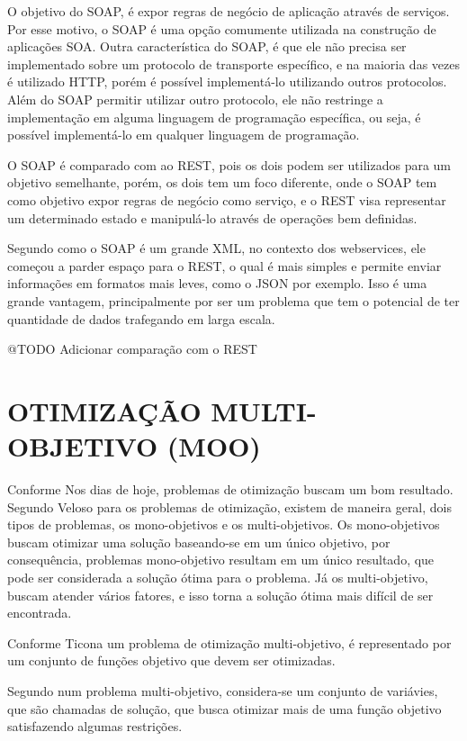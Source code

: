 O objetivo do SOAP, é expor regras de negócio de aplicação através de serviços. 
Por esse motivo, o SOAP é uma opção comumente utilizada na construção de aplicações SOA. 
Outra característica do SOAP, é que ele não precisa ser implementado sobre um protocolo de 
transporte específico, e na maioria das vezes é utilizado HTTP, porém é possível implementá-lo
utilizando outros protocolos. Além do SOAP permitir utilizar outro protocolo, 
ele não restringe a implementação em alguma linguagem de programação específica, ou seja,
é possível implementá-lo em qualquer linguagem de programação.

O SOAP é comparado com ao REST, pois os dois podem ser utilizados para um objetivo 
semelhante, porém, os dois tem um foco diferente, onde o SOAP tem como objetivo expor regras de negócio 
como serviço, e o REST visa representar um determinado estado e manipulá-lo através de operações 
bem definidas.

Segundo \cite{lecheta} como o SOAP é um grande XML, no contexto dos webservices, ele começou
a parder espaço para o REST, o qual é mais simples 
e permite enviar informações em formatos mais leves, como o JSON por exemplo. 
Isso é uma grande vantagem, principalmente por ser um problema
que tem o potencial de ter quantidade de dados trafegando em larga escala.

@TODO Adicionar comparação com o REST

\section{OTIMIZAÇÃO MULTI-OBJETIVO (MOO)}  
Conforme Nos dias de hoje, problemas de otimização buscam um bom resultado.
Segundo Veloso \cite{veloso} para os problemas de otimização, existem de maneira geral, 
dois tipos de problemas, os mono-objetivos e os multi-objetivos. 
Os mono-objetivos buscam otimizar uma solução baseando-se em um único objetivo, por consequência, 
problemas mono-objetivo resultam em um único resultado, que pode ser considerada a solução ótima para o 
problema. Já os multi-objetivo, buscam atender vários fatores, e isso torna a solução ótima mais 
difícil de ser encontrada.

Conforme Ticona \cite{ticona} um problema de otimização multi-objetivo, é representado por um 
conjunto de funções objetivo que devem ser otimizadas. 

Segundo \cite{Hashimoto} num problema multi-objetivo, considera-se um conjunto de 
variávies, que são chamadas de solução, que busca otimizar mais de uma função objetivo 
satisfazendo algumas restrições. 

